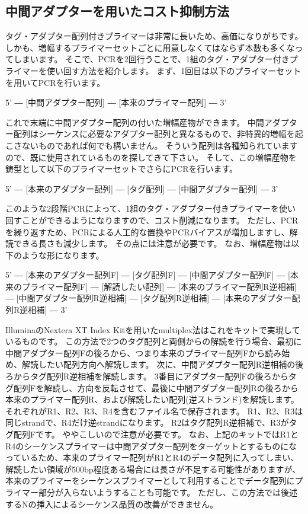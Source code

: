 \documentclass[titlepage,10pt,a4paper]{jsbook}
\newenvironment{pre}{\begin{leftbar}\raggedright\ttfamily\footnotesize\setlength{\baselineskip}{1.4em}}{\end{leftbar}\vspace{-1em}}
\begin{document}
\subsection{中間アダプターを用いたコスト抑制方法}

タグ・アダプター配列付きプライマーは非常に長いため、高価になりがちです。
しかも、増幅するプライマーセットごとに用意しなくてはならず本数も多くなってしまいます。
そこで、PCRを2回行うことで、1組のタグ・アダプター付きプライマーを使い回す方法を紹介します。
まず、1回目は以下のプライマーセットを用いてPCRを行います。
\begin{pre}
5' ― [中間アダプター配列] ― [本来のプライマー配列] ― 3'
\end{pre}
これで末端に中間アダプター配列の付いた増幅産物ができます。
中間アダプター配列はシーケンスに必要なアダプター配列と異なるもので、非特異的増幅を起こさないものであれば何でも構いません。
そういう配列は各種知られていますので、既に使用されているものを探してきて下さい。
そして、この増幅産物を鋳型として以下のプライマーセットでさらにPCRを行います。
\begin{pre}
5' ― [本来のアダプター配列] ― [タグ配列] ― [中間アダプター配列] ― 3'
\end{pre}
このような2段階PCRによって、1組のタグ・アダプター付きプライマーを使い回すことができるようになりますので、コスト削減になります。
ただし、PCRを繰り返すため、PCRによる人工的な置換やPCRバイアスが増加しますし、解読できる長さも減少します。
その点には注意が必要です。
なお、増幅産物は以下のような形になります。
\begin{pre}
5' ― [本来のアダプター配列F] ― [タグ配列F] ― [中間アダプター配列F] ― [本来のプライマー配列F] ― [解読したい配列] ― [本来のプライマー配列R逆相補] ― [中間アダプター配列R逆相補] ― [タグ配列R逆相補] ― [本来のアダプター配列R逆相補] ― 3'
\end{pre}
IlluminaのNextera XT Index Kitを用いたmultiplex法\citep{Illumina2013}はこれをキットで実現しているものです。
この方法で2つのタグ配列と両側からの解読を行う場合、最初に中間アダプター配列Fの後ろから、つまり本来のプライマー配列Fから読み始め、解読したい配列方向へ解読します。
次に、中間アダプター配列R逆相補の後ろからタグ配列R逆相補を解読します。
3番目にアダプター配列Fの後ろからタグ配列Fを解読し、方向を反転させて、最後に中間アダプター配列Rの後ろから本来のプライマー配列R、および解読したい配列(逆ストランド)を解読します。
それぞれがR1、R2、R3、R4を含むファイル名で保存されます。
R1、R2、R3は同じstrandで、R4だけ逆strandになります。
R2はタグ配列R逆相補で、R3がタグ配列Fです。
ややこしいので注意が必要です。
なお、上記のキットではR1とR4のシーケンスプライマーは中間アダプター配列をターゲットとするものになっているため、本来のプライマー配列がR1とR4のデータ配列に入ってしまい、解読したい領域が500bp程度ある場合には長さが不足する可能性がありますが、本来のプライマーをシーケンスプライマーとして利用することでデータ配列にプライマー部分が入らないようすることも可能です。
ただし、この方法では後述するNの挿入によるシーケンス品質の改善ができません。
\end{document}
